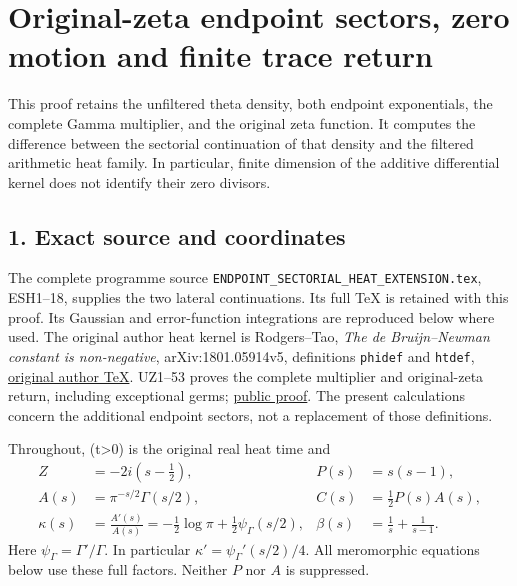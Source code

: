 \documentclass[
  10pt,
  a4paper,
]{article}
\author{}
\date{}
\begin{document}
{
\setcounter{tocdepth}{3}
\tableofcontents
}
\section{Original-zeta endpoint sectors, zero motion and finite trace
return}\label{original-zeta-endpoint-sectors-zero-motion-and-finite-trace-return}

This proof retains the unfiltered theta density, both endpoint
exponentials, the complete Gamma multiplier, and the original zeta
function. It computes the difference between the sectorial continuation
of that density and the filtered arithmetic heat family. In particular,
finite dimension of the additive differential kernel does not identify
their zero divisors.

\subsection{1. Exact source and
coordinates}\label{exact-source-and-coordinates}

The complete programme source
\texttt{ENDPOINT\_\allowbreak{}SECTORIAL\_\allowbreak{}HEAT\_\allowbreak{}EXTENSION.\allowbreak{}tex}, ESH1--18, supplies
the two lateral continuations. Its full TeX is retained with this proof.
Its Gaussian and error-function integrations are reproduced below where
used. The original author heat kernel is Rodgers--Tao, \emph{The de
Bruijn--Newman constant is non-negative}, arXiv:1801.05914v5,
definitions \texttt{phidef} and \texttt{htdef},
\href{https://arxiv.org/src/1801.05914v5}{original author TeX}. UZ1--53
proves the complete multiplier and original-zeta return, including
exceptional germs;
\href{https://github.com/KokunoYumeto/zeta-function-research-reader/blob/a8e35be8f238913ae5bcbd8ad55a07d539b350f3/workbenches/splitzero-tandem/branches/tau-zero-prime-positivity/FAITHFUL_UNCOMPLETED_ZETA_HEAT.md}{public
proof}. The present calculations concern the additional endpoint
sectors, not a replacement of those definitions.

Throughout, (t\textgreater0) is the original real heat time and \[
\begin{aligned}
Z&=-2i(s-\tfrac12),& P(s)&=s(s-1),\\
A(s)&=\pi^{-s/2}\Gamma(s/2),& C(s)&=\tfrac12P(s)A(s),\\
\kappa(s)&=\frac{A'(s)}{A(s)}
=-\tfrac12\log\pi+\tfrac12\psi_\Gamma(s/2),&
\beta(s)&=\frac1s+\frac1{s-1}.
\end{aligned}\tag{SER1}
\] Here \(\psi_\Gamma=\Gamma'/\Gamma\). In particular
\(\kappa'=\psi_\Gamma'(s/2)/4\). All meromorphic equations below use
these full factors. Neither \(P\) nor \(A\) is suppressed.
\end{document}
